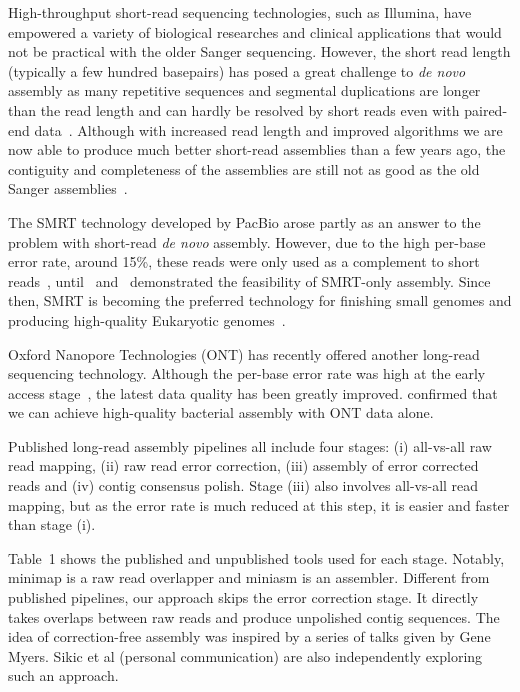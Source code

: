 \documentclass{bioinfo}
\begin{document}
High-throughput short-read sequencing technologies, such as Illumina, have
empowered a variety of biological researches and clinical applications that
would not be practical with the older Sanger sequencing. However, the short
read length (typically a few hundred basepairs) has posed a great challenge to
\emph{de novo} assembly as many repetitive sequences and segmental duplications
are longer than the read length and can hardly be resolved by short reads even
with paired-end data~\citep{Alkan:2011zr}. Although with increased read length
and improved algorithms we are now able to produce much better short-read
assemblies than a few years ago, the contiguity and completeness of the
assemblies are still not as good as the old Sanger
assemblies~\citep{Chaisson:2015wj}.

The SMRT technology developed by PacBio arose partly as an answer to the
problem with short-read \emph{de novo} assembly. However, due to the high
per-base error rate, around 15\%, these reads were only used as a complement to
short reads~\citep{Bashir:2012gb,Ribeiro:2012bx,Koren:2012pt},
until~\citet{Chin:2013qr} and~\citet{Koren:2013fc} demonstrated the feasibility
of SMRT-only assembly. Since then, SMRT is becoming the preferred technology
for finishing small genomes and producing high-quality Eukaryotic
genomes~\citep{Berlin:2015xy}.

Oxford Nanopore Technologies (ONT) has recently offered another long-read
sequencing technology. Although the per-base error rate was high at the
early access stage~\citep{Quick:2014uf}, the latest data quality has been
greatly improved. \citet{Loman:2015xu} confirmed that we can achieve
high-quality bacterial assembly with ONT data alone.

Published long-read assembly pipelines all include four stages: (i) all-vs-all
raw read mapping, (ii) raw read error correction, (iii) assembly of error
corrected reads and (iv) contig consensus polish. Stage (iii) also involves
all-vs-all read mapping, but as the error rate is much reduced at this step,
it is easier and faster than stage (i).

Table~1 shows the published and unpublished tools used for each stage. Notably,
minimap is a raw read overlapper and miniasm is an assembler. Different from
published pipelines, our approach skips the error correction stage.  It
directly takes overlaps between raw reads and produce unpolished contig
sequences. The idea of correction-free assembly was inspired by a series of
talks given by Gene Myers. Sikic et al (personal communication) are also
independently exploring such an approach.
\end{document}
